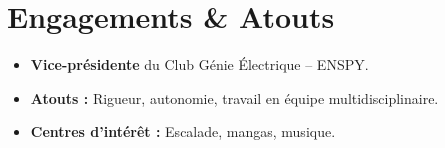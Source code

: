 \documentclass[a4paper,11pt]{article}
\begin{document}
\section{Engagements \& Atouts}
\begin{itemize}[leftmargin=*, nosep, label=\tiny$\bullet$]
    \item \small{\textbf{Vice-présidente} du Club Génie Électrique -- ENSPY.}
    \item \small{\textbf{Atouts :} Rigueur, autonomie, travail en équipe multidisciplinaire.}
    \item \small{\textbf{Centres d'intérêt :} Escalade, mangas, musique.}
\end{itemize}
\end{document}
